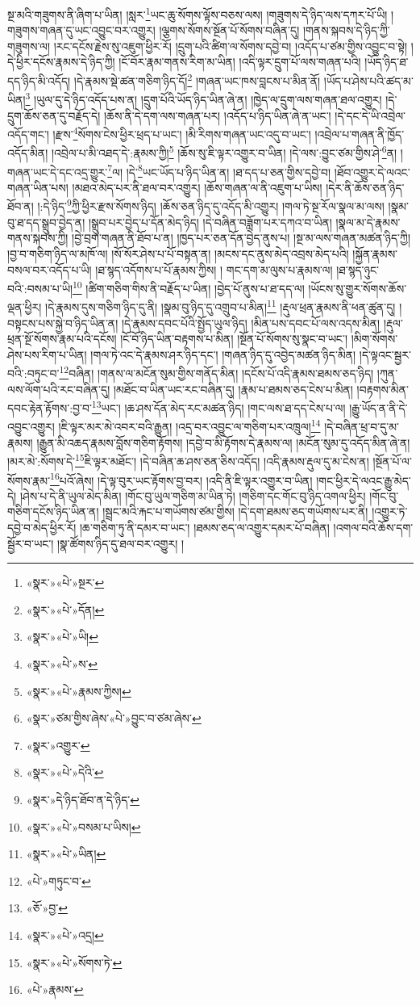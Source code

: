 སྔ་མའི་གཟུགས་ནི་ཞིག་པ་ཡིན། །སླར་\footnote{«སྣར་»«པེ་»སྔར་}ཡང་ཆུ་སོགས་ལྟོས་བཅས་ལས། །གཟུགས་དེ་ཉིད་ལས་དཀར་པོ་ཡི། །གཟུགས་གཞན་དུ་ཡང་འབྱུང་བར་འགྱུར། །ལྕགས་སོགས་སྔོན་པོ་སོགས་བཞིན་དུ། །གནས་སྐབས་དེ་ཉིད་ཀྱི་གཟུགས་ལ། །རང་དངོས་རྗེས་སུ་འཇུག་ཕྱིར་རོ། །དྲུག་པའི་ཚིག་ལ་སོགས་དབྱེ་བ། །འདོད་པ་ཙམ་གྱིས་འབྱུང་བ་སྟེ། །དེ་ཕྱིར་དངོས་རྣམས་དེ་ཉིད་ཀྱི། །ངོ་བོར་རྣམ་གནས་རིག་མ་ཡིན། །འདི་ལྟར་དྲུག་པོ་ལས་གཞན་པའི། །ཡོད་ཉིད་ཐ་དད་ཉིད་མི་འདོད། །དེ་རྣམས་སྡེ་ཚན་གཅིག་ཉིད་དོ།\footnote{«སྣར་»«པེ་»དོན།} །གཞན་ཡང་ཁས་བླངས་པ་མིན་ནོ། །ཡོད་པ་ཤེས་པའི་ཚད་མ་ཡིན།\footnote{«སྣར་»«པེ་»ཡི།} །ཡུལ་དུ་དེ་ཉིད་འདོད་པས་ན། །དྲུག་པོའི་ཡོད་ཉིད་ཡིན་ཞེ་ན། །ཁྱེད་ལ་དྲུག་ལས་གཞན་ཐལ་འགྱུར། །དེ་དྲུག་ཆོས་ཅན་དུ་བརྗོད་དེ། །ཆོས་ནི་དེ་དག་ལས་གཞན་པར། །འདོད་པ་ཉིད་ཡིན་ཞེ་ན་ཡང་། །དེ་དང་དེ་ཡི་འབྲེལ་འདོད་གང་། །རྫས་\footnote{«སྣར་»«པེ་»ས་}སོགས་ངེས་ཕྱིར་ཕྲད་པ་ཡང་། །མི་རིགས་གཞན་ཡང་འདུ་བ་ཡང་། །འབྲེལ་པ་གཞན་ནི་ཁྱོད་འདོད་མིན། །འབྲེལ་པ་མི་འཐད་དེ་:རྣམས་ཀྱི།\footnote{«སྣར་»«པེ་»རྣམས་ཀྱིས།} །ཆོས་སུ་ཇི་ལྟར་འགྱུར་བ་ཡིན། །དེ་ལས་:བྱུང་ཙམ་གྱིས་ཤེ་\footnote{«སྣར་»ཙམ་གྱིས་ཞེས་«པེ་»བྱུང་བ་ཙམ་ཞེས་}ན། །གཞན་ཡང་དེ་དང་འདྲ་གྱུར་\footnote{«སྣར་»འགྱུར་}ལ། །དེ་\footnote{«སྣར་»«པེ་»དེའི་}ཡང་ཡོད་པ་ཉིད་ཡིན་ན། །ཐ་དད་པ་ཅན་གྱིས་དབྱེ་བ། །ཐོབ་འགྱུར་དེ་ལའང་གཞན་ཡིན་པས། །མཐའ་མེད་པར་ནི་ཐལ་བར་འགྱུར། །ཆོས་གཞན་ལ་ནི་འཇུག་པ་ཡིས། །དེར་ནི་ཆོས་ཅན་ཉིད་ཐོབ་ན། །:དེ་ཉིད་\footnote{«སྣར་»དེ་ཉིད་ཐོབ་ན་དེ་ཉིད་}ཀྱི་ཕྱིར་རྫས་སོགས་ཉིད། །ཆོས་ཅན་ཉིད་དུ་འདོད་མི་འགྱུར། །གལ་ཏེ་སྔ་རོལ་སྣལ་མ་ལས། །སྣམ་བུ་ཐ་དད་སྒྲུབ་བྱེད་ན། །སྒྲུབ་པར་བྱེད་པ་དོན་མེད་ཉིད། །དེ་བཞིན་བཟློག་པར་དཀའ་བ་ཡིན། །སྣལ་མ་དེ་རྣམས་གནས་སྐབས་ཀྱི། །བྱེ་བྲག་གཞན་ནི་ཐོབ་པ་ན། །ཁྱད་པར་ཅན་དོན་བྱེད་ནུས་པ། །སྔ་མ་ལས་གཞན་མཚན་ཉིད་ཀྱི། །བྱ་བ་གཅིག་ཉིད་ལ་མཁོ་ལ། །སོ་སོར་ཤེས་པ་པོ་བསྟན་ན། །མངས་དང་ནུས་མེད་འབྲས་མེད་པའི། །སྐྱོན་རྣམས་བསལ་བར་འདོད་པ་ཡི། །ཐ་སྙད་འདོགས་པ་པོ་རྣམས་ཀྱིས། །
གང་དག་མ་ལུས་པ་རྣམས་ལ། །ཐ་སྙད་ཉུང་བའི་:བསམ་པ་ཡི།\footnote{«སྣར་»«པེ་»བསམ་པ་ཡིས།} །ཚིག་གཅིག་གིས་ནི་བརྗོད་པ་ཡིན། །བྱེད་པོ་ནུས་པ་ཐ་དད་ལ། །ཡོངས་སུ་གྱུར་སོགས་ཆོས་ལྡན་ཕྱིར། །དེ་རྣམས་དུས་གཅིག་ཉིད་དུ་ནི། །སྣམ་བུ་ཉིད་དུ་འགྲུབ་པ་མིན།\footnote{«སྣར་»«པེ་»ཡིན།} །རྡུལ་ཕྲན་རྣམས་ནི་ཕན་ཚུན་དུ། །བསྟངས་པས་སྐྱེ་བ་ཉིད་ཡིན་ན། །དེ་རྣམས་དབང་པོའི་སྤྱོད་ཡུལ་ཉིད། །མིན་པས་དབང་པོ་ལས་འདས་མིན། །རྡུལ་ཕྲན་སྔོ་སོགས་རྣམ་པའི་དངོས། །ངོ་བོ་ཉིད་ཡིན་བརྟགས་པ་མིན། །སྔོན་པོ་སོགས་སུ་སྣང་བ་ཡང་། །མིག་སོགས་ཤེས་པས་རིག་པ་ཡིན། །གལ་ཏེ་འང་དེ་རྣམས་ཤར་ཉིད་དང་། །གཞན་ཉིད་དུ་འབྱེད་མཚན་ཉིད་མིན། །དེ་ལྟའང་སྦྱར་བའི་:བཏུང་བ་\footnote{«པེ་»གཏུང་བ་}བཞིན། །གནས་ལ་མངོན་སུམ་གྱིས་གནོད་མིན། །དངོས་པོ་འདི་རྣམས་ཐམས་ཅད་ཉིད། །ཀུན་ལས་ལོག་པའི་རང་བཞིན་དུ། །མཐོང་བ་ཡིན་ཡང་རང་བཞིན་དུ། །རྣམ་པ་ཐམས་ཅད་ངེས་པ་མིན། །བརྟགས་མིན་དབང་རྟེན་རྟོགས་:བྱ་བ་\footnote{«ཅོ་»བྱ་}ཡང་། །ཆ་ཤས་དོན་མེད་རང་མཚན་ཉིད། །གང་ལས་ཐ་དད་ངེས་པ་ལ། །རྒྱུ་ཡོད་ན་ནི་དེ་འབྱུང་འགྱུར། །ཇི་ལྟར་མར་མེ་འབར་བའི་རྒྱུན། །འདྲ་བར་འབྱུང་ལ་གཅིག་པར་འཁྲུལ།\footnote{«སྣར་»«པེ་»འདྲ།} །དེ་བཞིན་ཕྲ་བ་དུ་མ་རྣམས། །རྒྱུན་མི་འཆད་རྣམས་བློས་གཅིག་རྟོགས། །དབྱེ་བ་མི་རྟོགས་དེ་རྣམས་ལ། །མངོན་སུམ་དུ་འདོད་མིན་ཞེ་ན། །མར་མེ་:སོགས་དེ་\footnote{«སྣར་»«པེ་»སོགས་ཏེ་}ཇི་ལྟར་མཐོང་། །དེ་བཞིན་ཆ་ཤས་ཅན་ཅིས་འདོད། །འདི་རྣམས་རྡུལ་དུ་མ་ངེས་ན། །སྔོན་པོ་ལ་སོགས་རྣམ་\footnote{«པེ་»རྣམས་}པའོ་ཞེས། །དེ་ལྟ་བུར་ཡང་རྟོགས་བྱ་བར། །འདི་ནི་ཇི་ལྟར་འགྱུར་བ་ཡིན། །གང་ཕྱིར་དེ་ལའང་རྒྱུ་མེད་དེ། །ཤེས་པ་དེ་ནི་ཡུལ་མེད་མིན། །གོང་བུ་ཡུལ་གཅིག་མ་ཡིན་ཏེ། །གཅིག་དང་གོང་བུ་ཉིད་འགལ་ཕྱིར། །གོང་བུ་གཅིག་དངོས་ཉིད་ཡིན་ན། །སྦྲང་མའི་རྐང་པ་གཡོགས་ཙམ་གྱིས། །དེ་དག་ཐམས་ཅད་གཡོགས་པར་ནི། །འགྱུར་ཏེ་དབྱེ་བ་མེད་ཕྱིར་རོ། །ཆ་གཅིག་ཏུ་ནི་དམར་བ་ཡང་། །ཐམས་ཅད་ལ་འགྱུར་དམར་པོ་བཞིན། །འགལ་བའི་ཆོས་དག་སྦྱོར་བ་ཡང་། །སྣ་ཚོགས་ཉིད་དུ་ཐལ་བར་འགྱུར། །
